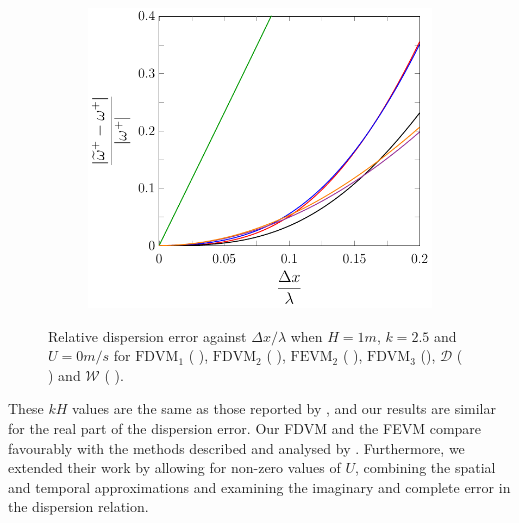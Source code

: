 \begin{figure}
\begin{subfigure}{0.5\textwidth}
	\end{subfigure}
	\par\bigskip
	\begin{subfigure}{0.5\textwidth}
		\includegraphics[width=\textwidth]{./chp4/figures/New/Dispu0Fill.pdf}
	\end{subfigure}
	\caption{Relative dispersion error against $\Delta x / \lambda$ when $H = 1m$, $k = 2.5$ and $U = 0m/s$ for $\text{FDVM}_1$ ({\color{green!60!black} \solidrule}), $\text{FDVM}_2$ ({\color{red} \solidrule}), $\text{FEVM}_2$ ({\color{blue} \solidrule}), $\text{FDVM}_3$ ({\solidrule}), $\mathcal{D}$ ({\color{violet!80!white} \solidrule}) and $\mathcal{W}$ ({\color{orange} \solidrule}).}
	\label{fig:Dispu0Fill}
\end{figure}

These $kH$ values are the same as those reported by \citet{Filippini-etal-2016-381}, and our results are similar for the real part of the dispersion error. Our FDVM and the FEVM compare favourably with the methods described and analysed by \citet{Filippini-etal-2016-381}. Furthermore, we extended their work by allowing for non-zero values of $U$, combining the spatial and temporal approximations and examining the imaginary and complete error in the dispersion relation. 

